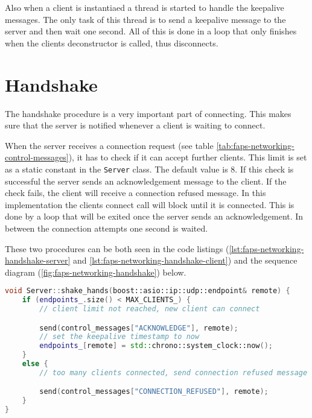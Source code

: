 Also when a client is instantiaed a thread is started to handle the keepalive messages. The only task of this thread is to send a keepalive message to the server and then wait one second. All of this is done in a loop that
only finishes when the clients deconstructor is called, thus disconnects.

\section {Handshake}

The handshake procedure is a very important part of connecting. This makes sure that the server is notified whenever a client is waiting to connect.

When the server receives a connection request (see table \vref{tab:faps-networking-control-messages}), it has to check if it can accept further clients. This limit is set as a static constant in the \lstinline{Server} class. The
default value is $ 8 $. If this check is successful the server sends an acknowledgement message to the client. If the check fails, the client will receive a connection refused message. In this implementation the
clients connect call will block until it is connected. This is done by a loop that will be exited once the server sends an acknowledgement. In between the connection attempts one second is waited.

These two procedures can be both seen in the code listings (\vref{lst:faps-networking-handshake-server} and \vref{lst:faps-networking-handshake-client}) and the sequence diagram (\vref{fig:faps-networking-handshake}) below.

\begin{minipage}{\linewidth}
\begin{lstlisting}[caption={Server handshake method}, label=lst:faps-networking-handshake-server, captionpos=b, language=C++]
void Server::shake_hands(boost::asio::ip::udp::endpoint& remote) {
    if (endpoints_.size() < MAX_CLIENTS_) {
        // client limit not reached, new client can connect

        send(control_messages["ACKNOWLEDGE"], remote);
        // set the keepalive timestamp to now
        endpoints_[remote] = std::chrono::system_clock::now();
    }
    else {
        // too many clients connected, send connection refused message

        send(control_messages["CONNECTION_REFUSED"], remote);
    }
}
\end{lstlisting}
\end{minipage}

